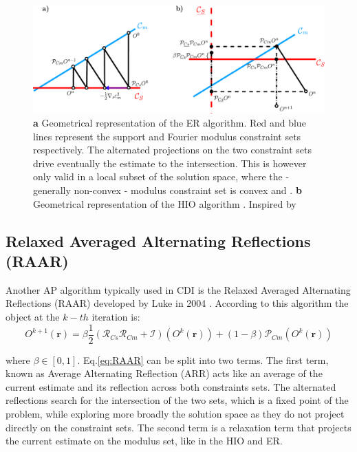 \begin{figure}[H]
    \centering
    \includegraphics[width=\textwidth]{figures/Intro/ER_HIO.pdf}
    \caption{\textbf{a} Geometrical representation of the ER algorithm. Red and blue lines represent the support and 
    Fourier modulus constraint sets respectively. The alternated projections on the two constraint sets drive eventually 
    the estimate to the intersection. This is however only valid in a local subset of the solution space, where the -
    generally non-convex - modulus constraint set is convex and . 
    \textbf{b} Geometrical representation of the HIO algorithm .
     Inspired by \cite{marchesini_unified_2007}}
    \label{fig:projections}
\end{figure}


\subsection{Relaxed Averaged Alternating Reflections (RAAR)}
Another AP algorithm typically used in CDI is the Relaxed Averaged Alternating Reflections (RAAR) developed by Luke 
in 2004 \cite{Luke_2004}. According to this algorithm the object at the $k-th$ iteration is: 
\begin{equation}
    O^{k+1}(\mathbf{r}) =\beta\frac{1}{2}(\mathcal{R}_{Cs}\mathcal{R}_{Cm} + \mathcal{I})(O^{k}(\mathbf{r})) + (1-\beta)\mathcal{P}_{Cm}(O^{k}(\mathbf{r}))
    \label{eq:RAAR}
\end{equation}

where $\beta \in [0,1]$. 
Eq.\ref{eq:RAAR} can be split into two terms. The first term, known as Average Alternating Reflection (ARR) \cite{AAR_2004} 
acts like an average of the current estimate and its reflection across both constraints sets. The alternated reflections search 
for the intersection of the two sets, which is a fixed point of the problem, while exploring more broadly the solution 
space as they do not project directly on the constraint sets. The second term is a relaxation term that 
projects the current estimate on the modulus set, like in the HIO and ER. 

